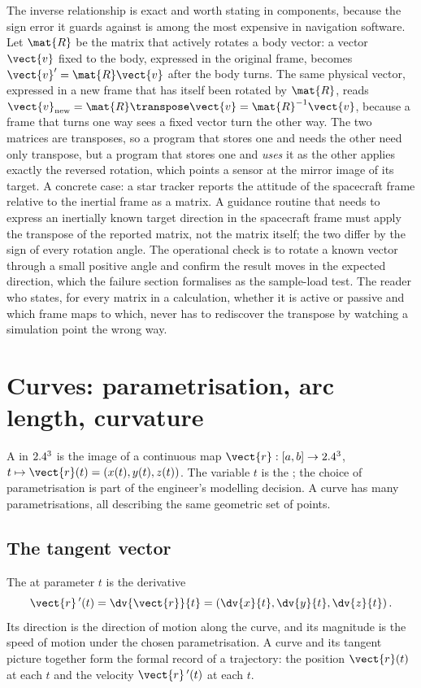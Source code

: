 The inverse relationship is exact and worth stating in components,
because the sign error it guards against is among the most expensive in
navigation software. Let $\mat{R}$ be the matrix that actively rotates
a body vector: a vector $\vect{v}$ fixed to the body, expressed in the
original frame, becomes $\vect{v}' = \mat{R}\vect{v}$ after the body
turns. The same physical vector, expressed in a new frame that has
itself been rotated by $\mat{R}$, reads $\vect{v}_{\text{new}} =
\mat{R}\transpose\vect{v} = \mat{R}^{-1}\vect{v}$, because a frame that
turns one way sees a fixed vector turn the other way. The two matrices
are transposes, so a program that stores one and needs the other need
only transpose, but a program that stores one and \emph{uses} it as the
other applies exactly the reversed rotation, which points a sensor at
the mirror image of its target. A concrete case: a star tracker
reports the attitude of the spacecraft frame relative to the inertial
frame as a matrix. A guidance routine that needs to express an
inertially known target direction in the spacecraft frame must apply
the transpose of the reported matrix, not the matrix itself; the two
differ by the sign of every rotation angle. The operational check is to
rotate a known vector through a small positive angle and confirm the
result moves in the expected direction, which the failure section
formalises as the sample-load test. The reader who states, for every
matrix in a calculation, whether it is active or passive and which
frame maps to which, never has to rediscover the transpose by watching a
simulation point the wrong way.

\section{Curves: parametrisation, arc length, curvature}

A  in $2.4^{3}$ is the image of a continuous map
$\vect{r}: [a, b] \to \R^{3}$, $t \mapsto \vect{r}(t) =
(x(t), y(t), z(t))$. The variable $t$ is the ; the
choice of parametrisation is part of the engineer's modelling
decision. A curve has many parametrisations, all describing the same
geometric set of points.

\subsection{The tangent vector}

The  at parameter $t$ is the derivative
\[
\vect{r}\,'(t) = \dv{\vect{r}}{t} =
\left(\dv{x}{t}, \dv{y}{t}, \dv{z}{t}\right).
\]
Its direction is the direction of motion along the curve, and its
magnitude is the speed of motion under the chosen parametrisation. A
curve and its tangent picture together form the formal record of a
trajectory: the position $\vect{r}(t)$ at each $t$ and the velocity
$\vect{r}\,'(t)$ at each $t$.

